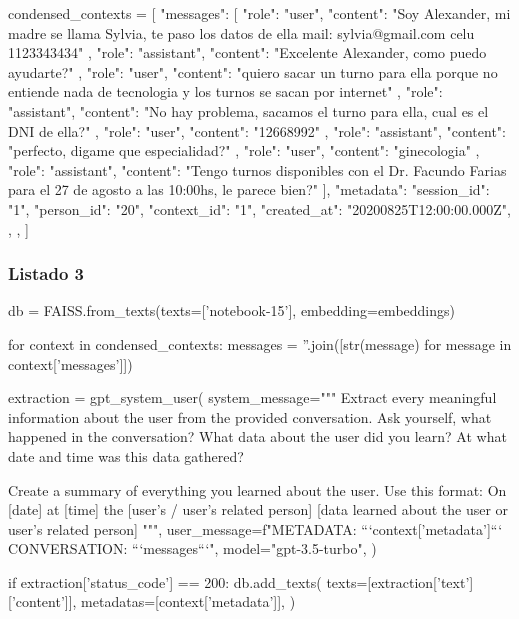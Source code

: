 \begin{APACode}
condensed_contexts = [
    {
        "messages": [
            {
                "role": "user",
                "content": "Soy Alexander, mi madre se llama Sylvia, te paso los 
                           datos de ella mail: sylvia@gmail.com celu 1123343434"
            },
            {
                "role": "assistant",
                "content": "Excelente Alexander, como puedo ayudarte?"
            },
            {
                "role": "user",
                "content": "quiero sacar un turno para ella porque no entiende 
                           nada de tecnologia y los turnos se sacan por internet"
            },
            {
                "role": "assistant",
                "content": "No hay problema, sacamos el turno para ella, 
                           cual es el DNI de ella?"
            },
            {
                "role": "user",
                "content": "12668992"
            },
            {
                "role": "assistant",
                "content": "perfecto, digame que especialidad?"
            },
            {
                "role": "user",
                "content": "ginecologia"
            },
            {
                "role": "assistant",
                "content": "Tengo turnos disponibles con el Dr. Facundo Farias 
                           para el 27 de agosto a las 10:00hs, le parece bien?"
            }
        ],
        "metadata": {
            "session_id": "1",
            "person_id": "20",
            "context_id": "1",
            "created_at": "20200825T12:00:00.000Z",
        },
    },
]
\end{APACode}

\subsubsection{Listado 3}
\label{anexo:code-4-1-15-3}

\begin{APACode}
db = FAISS.from_texts(texts=['notebook-15'], embedding=embeddings)

for context in condensed_contexts:
    messages = ''.join([str(message) for message in context['messages']])
    
    extraction = gpt_system_user(
        system_message="""
        Extract every meaningful information about the user from the provided 
        conversation. Ask yourself, what happened in the conversation?
        What data about the user did you learn?
        At what date and time was this data gathered?
        
        Create a summary of everything you learned about the user. Use this format:
        On [date] at [time] the [user's / user's related person] [data learned 
        about the user or user's related person]
        """,
        user_message=f"METADATA: ```{context['metadata']}``` 
                      CONVERSATION: ```{messages}```",
        model="gpt-3.5-turbo",
    )
    
    if extraction['status_code'] == 200:
        db.add_texts(
            texts=[extraction['text']['content']],
            metadatas=[context['metadata']],
        )
\end{APACode}


